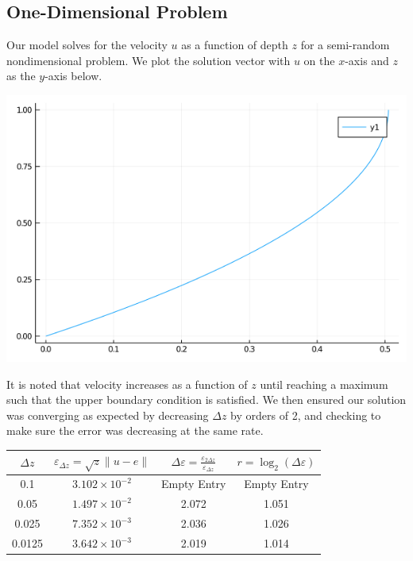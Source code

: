 \documentclass[11pt]{article}
\begin{document}
	\subsection{One-Dimensional Problem}
	Our model solves for the velocity $ u $ as a function of depth $ z $ for a semi-random nondimensional problem. We plot the solution vector with $ u $ on the $ x $-axis and $ z $ as the $ y $-axis below.
	\begin{center}
		\includegraphics[scale=0.5]{1D_low_res.png}
	\end{center}
	It is noted that velocity increases as a function of $ z $ until reaching a maximum such that the upper boundary condition is satisfied.
	\newline\indent
	We then ensured our solution was converging as expected by decreasing $ \Delta z $ by orders of 2, and checking to make sure the error was decreasing at the same rate.
	\begin{center}
		\renewcommand{\arraystretch}{2.0}
		\begin{tabular}{c|c|c|c}
			\hline\hline
			$\displaystyle \Delta z $&$\displaystyle \varepsilon_{\Delta z} = \sqrt{z}\lVert u-e\rVert $&$ \displaystyle \Delta\varepsilon = \frac{\varepsilon_{2\Delta z}}{\varepsilon_{\Delta z}} $&$\displaystyle r = \log_2\left(\Delta\varepsilon\right) $\\
			\hline
			0.1&$3.102\times 10^{-2}$&Empty Entry&Empty Entry\\
			0.05&$1.497\times 10^{-2}$&2.072&1.051\\
			0.025&$7.352\times 10^{-3}$&2.036&1.026\\
			0.0125&$3.642\times 10^{-3}$&2.019&1.014\\
			\hline
		\end{tabular}
	\end{center}
\end{document}
